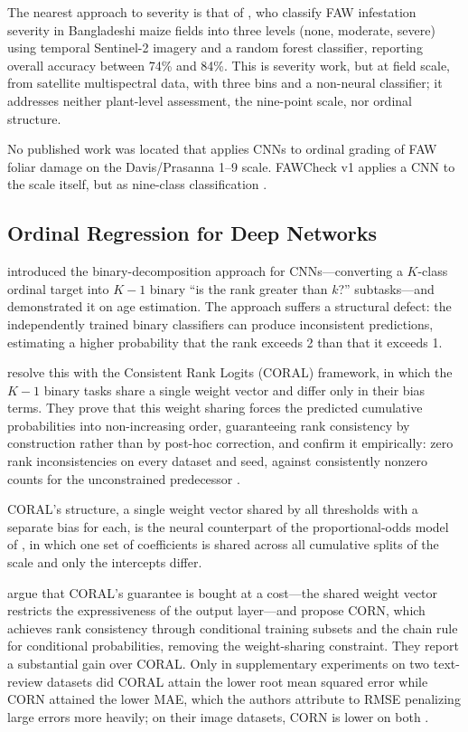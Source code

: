 \documentclass{icsthesis}
\begin{document}
\begin{mainmatter}
				The nearest approach to severity is that of \citet{dzurume2025}, who classify FAW
				infestation severity in Bangladeshi maize fields into three levels (none, moderate,
				severe) using temporal Sentinel-2 imagery and a random forest classifier, reporting
				overall accuracy between 74\% and 84\%. This is severity work, but at field scale,
				from satellite multispectral data, with three bins and a non-neural classifier; it
				addresses neither plant-level assessment, the nine-point scale, nor ordinal
				structure.

				No published work was located that applies CNNs to ordinal grading of FAW foliar
				damage on the Davis/Prasanna 1--9 scale. FAWCheck v1 applies a CNN to the scale
				itself, but as nine-class classification \citep{casasola2026}.

			\subsection{Ordinal Regression for Deep Networks}\label{sec:ordinal}

				\citet{niu2016} introduced the binary-decomposition approach for CNNs---converting a
				$K$-class ordinal target into $K-1$ binary ``is the rank greater than $k$?''
				subtasks---and demonstrated it on age estimation. The approach suffers a structural
				defect: the independently trained binary classifiers can produce inconsistent
				predictions, estimating a higher probability that the rank exceeds 2 than that it
				exceeds 1.

				\citet{cao2020} resolve this with the Consistent Rank Logits (CORAL) framework, in
				which the $K-1$ binary tasks share a single weight vector and differ only in their
				bias terms. They prove that this weight sharing forces the predicted cumulative
				probabilities into non-increasing order, guaranteeing rank consistency by
				construction rather than by post-hoc correction, and confirm it empirically: zero
				rank inconsistencies on every dataset and seed, against consistently nonzero counts
				for the unconstrained predecessor \citep{cao2020}.

				CORAL's structure, a single weight vector shared by all thresholds with a separate
				bias for each, is the neural counterpart of the proportional-odds model of
				\citet{mccullagh1980}, in which one set of coefficients is shared across all
				cumulative splits of the scale and only the intercepts differ.

				\citet{shi2023corn} argue that CORAL's guarantee is bought at a cost---the shared
				weight vector restricts the expressiveness of the output layer---and propose CORN,
				which achieves rank consistency through conditional training subsets and the chain
				rule for conditional probabilities, removing the weight-sharing constraint. They
				report a substantial gain over CORAL. Only in supplementary experiments on two
				text-review datasets did CORAL attain the lower root mean squared error while CORN
				attained the lower MAE, which the authors attribute to RMSE penalizing large errors
				more heavily; on their image datasets, CORN is lower on both \citep{shi2023corn}.


\end{mainmatter}
\end{document}
